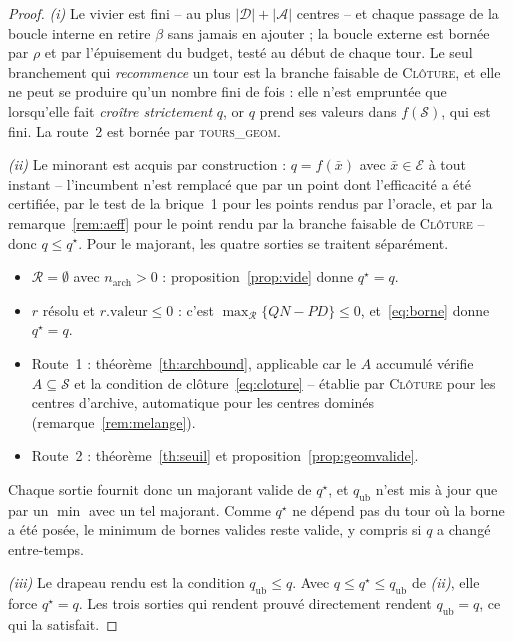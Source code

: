 \documentclass[11pt,a4paper]{article}
\theoremstyle{plain}
\theoremstyle{remark}
\newcommand{\Ecal}{\mathcal{E}}
\newcommand{\Scal}{\mathcal{S}}
\newcommand{\Rcal}{\mathcal{R}}
\newcommand{\Acal}{\mathcal{A}}
\newcommand{\qs}{q^{\star}}
\begin{document}
\begin{proof}
\emph{(i)} Le vivier est fini -- au plus $|\mathcal{D}|+|\Acal|$ centres --
et chaque passage de la boucle interne en retire $\beta$ sans jamais en
ajouter ; la boucle externe est bornée par $\rho$ et par l'épuisement du
budget, testé au début de chaque tour. Le seul branchement qui
\emph{recommence} un tour est la branche faisable de \textsc{Clôture}, et
elle ne peut se produire qu'un nombre fini de fois : elle n'est empruntée
que lorsqu'elle fait \emph{croître strictement} $q$, or $q$ prend ses
valeurs dans $f(\Scal)$, qui est fini. La route~2 est bornée par
\textsc{tours\_geom}.

\emph{(ii)} Le minorant est acquis par construction : $q=f(\bar x)$ avec
$\bar x\in\Ecal$ à tout instant -- l'incumbent n'est remplacé que par un
point dont l'efficacité a été certifiée, par le test de la brique~1 pour
les points rendus par l'oracle, et par la remarque~\ref{rem:aeff} pour le
point rendu par la branche faisable de \textsc{Clôture} -- donc
$q\le\qs$. Pour le majorant, les quatre sorties se traitent séparément.
\begin{itemize}[leftmargin=1.4em]
\item $\Rcal=\emptyset$ avec $n_{\text{arch}}>0$ : proposition~\ref{prop:vide}
  donne $\qs=q$.
\item $r$ résolu et $r.\text{valeur}\le 0$ : c'est
  $\max_{\Rcal}\{QN-PD\}\le 0$, et~\eqref{eq:borne} donne $\qs=q$.
\item Route~1 : théorème~\ref{th:archbound}, applicable car le $A$
  accumulé vérifie $A\subseteq\Scal$ et la condition de
  clôture~\eqref{eq:cloture} -- établie par \textsc{Clôture} pour les
  centres d'archive, automatique pour les centres dominés
  (remarque~\ref{rem:melange}).
\item Route~2 : théorème~\ref{th:seuil} et
  proposition~\ref{prop:geomvalide}.
\end{itemize}
Chaque sortie fournit donc un majorant valide de $\qs$, et
$q_{\text{ub}}$ n'est mis à jour que par un $\min$ avec un tel majorant.
Comme $\qs$ ne dépend pas du tour où la borne a été posée, le minimum de
bornes valides reste valide, y compris si $q$ a changé entre-temps.

\emph{(iii)} Le drapeau rendu est la condition $q_{\text{ub}}\le q$. Avec
$q\le\qs\le q_{\text{ub}}$ de \emph{(ii)}, elle force $\qs=q$. Les trois
sorties qui rendent \textsf{prouvé} directement rendent $q_{\text{ub}}=q$,
ce qui la satisfait.
\end{proof}
\end{document}
